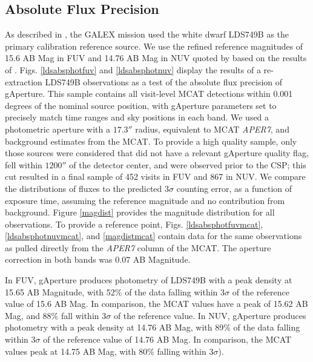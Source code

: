 \documentclass[preprint]{aastex}
\begin{document}
\subsection{Absolute Flux Precision}
As described in \citet{mor2007}, the GALEX mission used the white dwarf LDS749B as the primary calibration reference source. We use the refined reference magnitudes of 15.6 AB Mag in FUV and 14.76 AB Mag in NUV quoted by \cite{camarota2014white} based on the results of \cite{bohlin2008absolute}. Figs. \ref{ldsabsphotfuv} and \ref{ldsabsphotnuv} display the results of a re-extraction LDS749B observations as a test of the absolute flux precision of gAperture. This sample contains all visit-level MCAT detections within 0.001 degrees of the nominal source position, with gAperture parameters set to precisely match time ranges and sky positions in each band. We used a photometric aperture with a $17.3''$ radius, equivalent to MCAT \emph{APER7}, and background estimates from the MCAT. To provide a high quality sample, only those sources were considered that did not have a relevant gAperture quality flag, fell within $1200''$ of the detector center, and were observed prior to the CSP; this cut resulted in a final sample of 452 visits in FUV and 867 in NUV. We compare the distributions of fluxes to the predicted 3$\sigma$ counting error, as a function of exposure time, assuming the reference magnitude and no contribution from background. Figure \ref{magdist} provides the magnitude distribution for all observations. To provide a reference point, Figs. \ref{ldsabsphotfuvmcat}, \ref{ldsabsphotnuvmcat}, and \ref{magdistmcat} contain data for the same observations as pulled directly from the \emph{APER7} column of the MCAT. The aperture correction in both bands was 0.07 AB Magnitude.

In FUV, gAperture produces photometry of LDS749B with a peak density at 15.65 AB Magnitude, with 52\% of the data falling within 3$\sigma$ of the reference value of 15.6 AB Mag. In comparison, the MCAT values have a peak of 15.62 AB Mag, and 88\% fall within 3$\sigma$ of the reference value. In NUV, gAperture produces photometry with a peak density at 14.76 AB Mag, with 89\% of the data falling within 3$\sigma$ of the reference value of 14.76 AB Mag. In comparison, the MCAT values peak at 14.75 AB Mag, with 80\% falling within 3$\sigma$).
\end{document}
